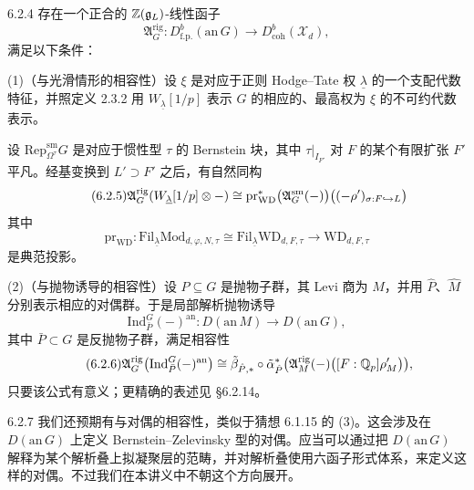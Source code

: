 \begin{conj}{6.2.4}\label{conj:a4-6-2-4}
存在一个正合的 $\mathbb{Z}(\mathfrak g_L)$-线性函子
\[
\mathfrak A^{\mathrm{rig}}_G:D^b_{\mathrm{f.p.}}(\mathrm{an}\,G)\to D^b_{\mathrm{coh}}(\mathcal X_d),
\]
满足以下条件：

(1)（与光滑情形的相容性）设 $\xi$ 是对应于正则 Hodge--Tate 权 $\underline\lambda$ 的一个支配代数特征，并照定义 2.3.2 用 $W_{\underline\lambda}[1/p]$ 表示 $G$ 的相应的、最高权为 $\xi$ 的不可约代数表示。

设 $\mathrm{Rep}^{\mathrm{sm}}_{\Omega^\tau}G$ 是对应于惯性型 $\tau$ 的 Bernstein 块，其中 $\tau|_{I_{F'}}$ 对 $F$ 的某个有限扩张 $F'$ 平凡。经基变换到 $L'\supset F'$ 之后，有自然同构
\begin{equation}\tag{6.2.5}\label{eq:a4-6-2-5}
\mathfrak A^{\mathrm{rig}}_G(W_{\underline\lambda}[1/p]\otimes-)
\cong\mathrm{pr}^*_{\mathrm{WD}}\bigl(\mathfrak A^{\mathrm{sm}}_G(-)\bigr)
\bigl((-\rho')_{\sigma:F\hookrightarrow L}\bigr)
\end{equation}
其中
\[
\mathrm{pr}_{\mathrm{WD}}:\mathrm{Fil}_{\underline\lambda}\mathrm{Mod}_{d,\varphi,N,\tau}
\cong\mathrm{Fil}_{\underline\lambda}\mathrm{WD}_{d,F,\tau}
\longrightarrow\mathrm{WD}_{d,F,\tau}
\]
是典范投影。

(2)（与抛物诱导的相容性）设 $P\subseteq G$ 是抛物子群，其 Levi 商为 $M$，并用 $\hat P$、$\hat M$ 分别表示相应的对偶群。于是局部解析抛物诱导
\[
\mathrm{Ind}^G_{\bar P}(-)^{\mathrm{an}}:D(\mathrm{an}\,M)\to D(\mathrm{an}\,G),
\]
其中 $\bar P\subset G$ 是反抛物子群，满足相容性
\begin{equation}\tag{6.2.6}\label{eq:a4-6-2-6}
\mathfrak A^{\mathrm{rig}}_G\bigl(\mathrm{Ind}^G_{\bar P}(-)^{\mathrm{an}}\bigr)
\cong\tilde\beta_{\hat P,*}\circ\tilde\alpha^*_{\hat P}
\bigl(\mathfrak A^{\mathrm{rig}}_M(-)\bigl([F:\mathbb{Q}_p]\rho'_M\bigr)\bigr),
\end{equation}
只要该公式有意义；更精确的表述见 §6.2.14。
\end{conj}

\begin{rem}{6.2.7}
我们还预期有与对偶的相容性，类似于猜想 6.1.15 的 (3)。这会涉及在 $D(\mathrm{an}\,G)$ 上定义 Bernstein--Zelevinsky 型的对偶。应当可以通过把 $D(\mathrm{an}\,G)$ 解释为某个解析叠上拟凝聚层的范畴，并对解析叠使用六函子形式体系，来定义这样的对偶。不过我们在本讲义中不朝这个方向展开。
\end{rem}

